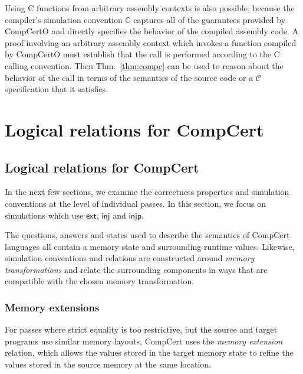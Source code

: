 \documentclass[draft,11pt]{report}
\newcommand{\kw}[1]{\ensuremath{ \mathsf{#1} }}
\begin{document}
Using C functions from
arbitrary assembly contexts is also possible,
because the compiler's simulation convention $\mathbb{C}$
captures all of the guarantees provided by CompCertO and
directly specifies the behavior of the compiled assembly code.
A proof involving an arbitrary assembly context
which invokes a function compiled by CompCertO
must establish that the call is performed
according to the C calling convention.
Then Thm.~\ref{thm:compc}
can be used to reason about the behavior of the call
in terms of the semantics of the source code
or a $\mathcal{C}$ specification that it satisfies.




\chapter{Logical relations for CompCert} %

\section{Logical relations for CompCert} \label{sec:cklr} %

In the next few sections,
we examine the correctness properties
and simulation conventions
at the level of individual passes.
In this section,
we focus on simulations which use
$\kw{ext}$, $\kw{inj}$ and $\kw{injp}$.

The questions, answers and states
used to describe the semantics of CompCert languages all contain
a memory state and surrounding runtime values.
Likewise, simulation conventions and relations
are constructed around \emph{memory transformations}
and relate the surrounding components in ways that %
are compatible with the chosen memory transformation.

\subsection{Memory extensions} \label{sec:memext} %

For passes where strict equality is too restrictive,
but the source and target programs
use similar memory layouts,
CompCert uses the \emph{memory extension} relation,
which allows the values
stored in the target memory state to refine
the values stored in the source memory at the same location.
\end{document}
